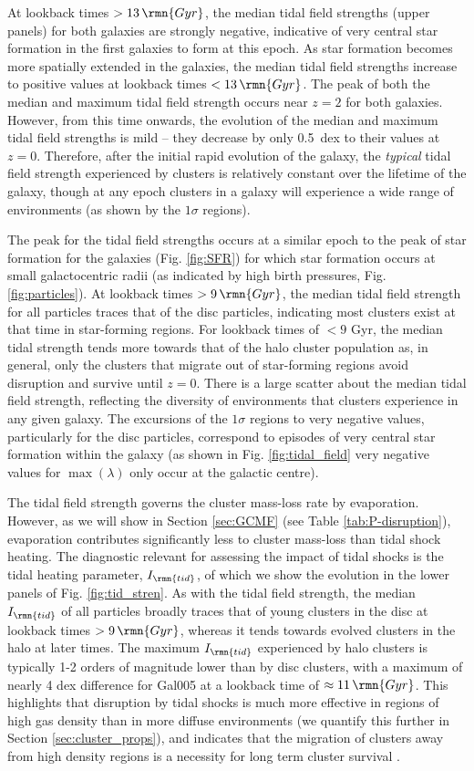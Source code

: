 \documentclass[fleqn,usenatbib]{mnras}
\newcommand\Gyr{\,\rmn{Gyr}}
\begin{document}
At lookback times $>13 \Gyr$, the median tidal field strengths (upper panels) for both galaxies are strongly negative, indicative of very central star formation in the first galaxies to form at this epoch. As star formation becomes more spatially extended in the galaxies, the median tidal field strengths increase to positive values at lookback times $<13 \Gyr$.
The peak of both the median and maximum tidal field strength occurs near $z=2$ for both galaxies. However, from this time onwards, the evolution of the median and maximum tidal field strengths is mild -- they decrease by only 0.5~dex to their values at $z=0$. Therefore, after the initial rapid evolution of the galaxy, the \textit{typical} tidal field strength experienced by clusters is relatively constant over the lifetime of the galaxy, though at any epoch clusters in a galaxy will experience a wide range of environments (as shown by the $1\sigma$ regions).

The peak for the tidal field strengths occurs at a similar epoch to the peak of star formation for the galaxies (Fig. \ref{fig:SFR}) for which star formation occurs at small galactocentric radii (as indicated by high birth pressures, Fig. \ref{fig:particles}). At lookback times $>9 \Gyr$, the median tidal field strength for all particles traces that of the disc particles, indicating most clusters exist at that time in star-forming regions.
For lookback times of $<9$ Gyr, the median tidal strength tends more towards that of the halo cluster population as, in general, only the clusters that migrate out of star-forming regions avoid disruption and survive until $z=0$. There is a large scatter about the median tidal field strength, reflecting the diversity of environments that clusters experience in any given galaxy. The excursions of the $1\sigma$ regions to very negative values, particularly for the disc particles, correspond to episodes of very central star formation within the galaxy (as shown in Fig. \ref{fig:tidal_field} very negative values for $\max(\lambda)$ only occur at the galactic centre).

The tidal field strength governs the cluster mass-loss rate by evaporation. However, as we will show in Section \ref{sec:GCMF} (see Table \ref{tab:P-disruption}), evaporation contributes significantly less to cluster mass-loss than tidal shock heating. The diagnostic relevant for assessing the impact of tidal shocks is the tidal heating parameter, $I_\rmn{tid}$, of which we show the evolution in the lower panels of Fig. \ref{fig:tid_stren}. As with the tidal field strength, the median $I_\rmn{tid}$ of all particles broadly traces that of young clusters in the disc at lookback times $>9 \Gyr$, whereas it tends towards evolved clusters in the halo at later times. The maximum $I_\rmn{tid}$ experienced by halo clusters is typically 1-2 orders of magnitude lower than by disc clusters, with a maximum of nearly 4 dex difference for Gal005 at a lookback time of $\approx11 \Gyr$. This highlights that disruption by tidal shocks is much more effective in regions of high gas density than in more diffuse environments (we quantify this further in Section \ref{sec:cluster_props}), and indicates that the migration of clusters away from high density regions is a necessity for long term cluster survival \citep{Kruijssen_15}.
\end{document}
